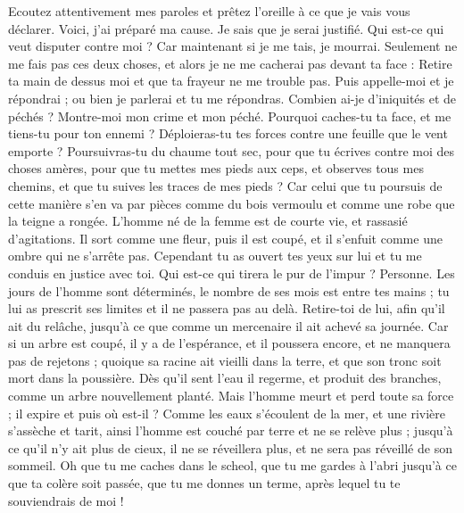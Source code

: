 \begin{multicols}{2}
Ecoutez attentivement mes paroles et prêtez l'oreille à ce que je vais vous déclarer. 
Voici, j'ai préparé ma cause. Je sais que je serai justifié.
Qui est-ce qui veut disputer contre moi ? Car maintenant si je me tais, je mourrai. 
Seulement ne me fais pas ces deux choses, et alors je ne me cacherai pas devant ta face :
Retire ta main de dessus moi et que ta frayeur ne me trouble pas.
Puis appelle-moi et je répondrai ; ou bien je parlerai et tu me répondras. 
Combien ai-je d'iniquités et de péchés ? Montre-moi mon crime et mon péché. 
Pourquoi caches-tu ta face, et me tiens-tu pour ton ennemi ?
Déploieras-tu tes forces contre une feuille que le vent emporte ? Poursuivras-tu du chaume tout sec,
pour que tu écrives contre moi des choses amères,
pour que tu mettes mes pieds aux ceps, et observes tous mes chemins, et que tu suives les traces de mes pieds ?
Car celui que tu poursuis de cette manière s'en va par pièces comme du bois vermoulu et comme une robe que la teigne a rongée. 
\VerseOne{}L'homme né de la femme est de courte vie, et rassasié d'agitations.
Il sort comme une fleur, puis il est coupé, et il s'enfuit comme une ombre qui ne s'arrête pas.
Cependant tu as ouvert tes yeux sur lui et tu me conduis en justice avec toi.
Qui est-ce qui tirera le pur de l'impur ? Personne.
Les jours de l'homme sont déterminés, le nombre de ses mois est entre tes mains ; tu lui as prescrit ses limites et il ne passera pas au delà.
Retire-toi de lui, afin qu'il ait du relâche, jusqu'à ce que comme un mercenaire il ait achevé sa journée.
Car si un arbre est coupé, il y a de l'espérance, et il poussera encore, et ne manquera pas de rejetons ; 
quoique sa racine ait vieilli dans la terre, et que son tronc soit mort dans la poussière.
Dès qu'il sent l'eau il regerme, et produit des branches, comme un arbre nouvellement planté. 
Mais l'homme meurt et perd toute sa force ; il expire et puis où est-il ?
Comme les eaux s'écoulent de la mer, et une rivière s'assèche et tarit,
 ainsi l'homme est couché par terre et ne se relève plus ; jusqu'à ce qu'il n'y ait plus de cieux, il ne se réveillera plus, et ne sera pas réveillé de son sommeil. 
Oh que tu me caches dans le scheol, que tu me gardes à l'abri jusqu'à ce que ta colère soit passée, que tu me donnes un terme, après lequel tu te souviendrais de moi !

\end{multicols}
